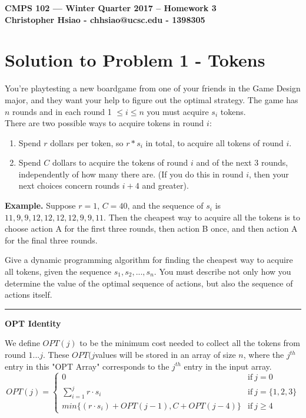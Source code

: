 \documentclass[11pt]{article}
\begin{document}
\begin{center}
{\bf\Large CMPS 102 --- Winter Quarter 2017 --  Homework 3}\\
{\bf Christopher Hsiao - chhsiao@ucsc.edu - 1398305}
\end{center}

\section*{Solution to Problem 1 - Tokens}

You're playtesting a new boardgame from one of your friends in the Game Design major, and they want your help to figure out the optimal strategy. The game has $n$ rounds and in each round 1 $\leq i \leq n$ you must acquire $s_i$ tokens.\\
There are two possible ways to acquire tokens in round $i$:

\begin{enumerate}[label=(\Alph*)]
\item Spend $r$ dollars per token, so $r * s_i$ in total, to acquire all tokens of round $i$.
\item Spend $C$ dollars to acquire the tokens of round $i$ and of the next 3 rounds, independently of how many there are. (If you do this in round $i$, then your next choices concern rounds $i + 4$ and greater).
\end{enumerate}

\textbf{Example.} Suppose $r = 1$, $C = 40$, and the sequence of $s_i$ is $11, 9, 9, 12, 12, 12, 12, 9, 9, 11$. Then the cheapest way to acquire all the tokens is to choose action A for the first three rounds, then action B once, and then action A for the final three rounds.


Give a dynamic programming algorithm for finding the cheapest way to acquire all tokens, given the sequence $s_1, s_2, ..., s_n$. You must describe not only how you determine the value of the optimal sequence of actions, but also the sequence of actions itself.

\noindent\rule{17cm}{0.4pt}

\textbf{OPT Identity}

We define $OPT(j)$ to be the minimum cost needed to collect all the tokens from round $1...j$. 
These $OPT(j $values will be stored in an array of size $n$, where the $j^{th}$ entry in this "OPT Array" corresponds to the $j^{th}$ entry in the input array.
\begin{equation}
	OPT(j) = 
	\begin{cases}
	0 & \text{if} \ j = 0\\
	\sum_{i=1}^{j} r \cdot s_i & \text{if} \ j = \{1, 2, 3\}\\
	min\{(r \cdot s_i) + OPT(j - 1), C + OPT(j-4)\} & \text{if} \ j \geq 4
	\end{cases}
\end{equation}
\end{document}

